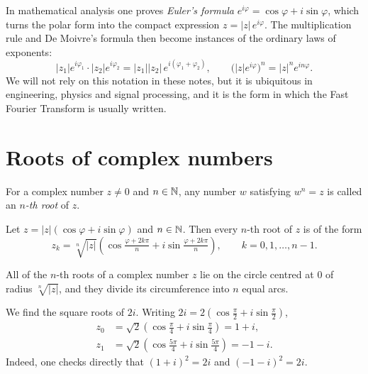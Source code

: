 \begin{remark}
In mathematical analysis one proves \emph{Euler's formula} $e^{i\varphi} = \cos\varphi + i\sin\varphi$, which
turns the polar form into the compact expression $z = |z|\,e^{i\varphi}$. The multiplication rule and
De Moivre's formula then become instances of the ordinary laws of exponents:
\[
|z_1|e^{i\varphi_1}\cdot |z_2|e^{i\varphi_2} = |z_1||z_2|\,e^{i(\varphi_1+\varphi_2)}, \qquad
\big(|z|e^{i\varphi}\big)^n = |z|^n e^{in\varphi}.
\]
We will not rely on this notation in these notes, but it is ubiquitous in engineering, physics and signal
processing, and it is the form in which the Fast Fourier Transform is usually written.
\end{remark}

\section{Roots of complex numbers}

\begin{definition}
For a complex number $z\neq 0$ and $n\in\mathbb{N}$, any number $w$ satisfying $w^n=z$ is called an \emph{$n$-th root}
of $z$.
\end{definition}

\begin{theorem}
Let $z=|z|(\cos \varphi + i\sin\varphi)$ and $n\in \mathbb{N}$. Then every $n$-th root of $z$ is of the form
\[
z_k = \sqrt[n]{|z|}\left(\cos \tfrac{\varphi+2k\pi}{n} + i\sin \tfrac{\varphi+2k\pi}{n}\right),
\qquad k=0,1,\ldots, n-1.
\]
\end{theorem}

\begin{fact}
All of the $n$-th roots of a complex number $z$ lie on the circle centred at $0$ of radius $\sqrt[n]{|z|}$,
and they divide its circumference into $n$ equal arcs.
\end{fact}

\begin{example}
We find the square roots of $2i$. Writing $2i = 2\left(\cos\tfrac\pi2 + i \sin \tfrac\pi2\right)$,
\[
\begin{aligned}
z_0 &= \sqrt{2}\left(\cos\tfrac{\pi}{4} + i \sin \tfrac{\pi}{4}\right)=1+i,\\
z_1 &= \sqrt{2}\left(\cos\tfrac{5\pi}{4} + i \sin \tfrac{5\pi}{4}\right)=-1-i.
\end{aligned}
\]
Indeed, one checks directly that $(1+i)^2 = 2i$ and $(-1-i)^2 = 2i$.
\end{example}

